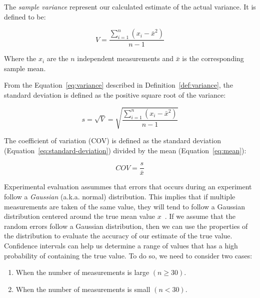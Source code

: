 \begin{definition}
 The \emph{sample variance}
represent our calculated estimate of the actual variance. It is defined to be:

\begin{equation}\label{eq:variance}
V = \frac{\sum_{i = 1}^n(x_i - \bar{x}^2)}{n - 1}
\end{equation}

\noindent Where the \(x_i\) are the \(n\) independent measurements and \(\bar{x}\) is
the corresponding sample mean.
\end{definition}

\begin{definition}
 From the Equation~\ref{eq:variance} described in Definition~\ref{def:variance}, the standard
deviation is defined as the positive square root of the variance:

\begin{equation}\label{eq:standard-deviation}
s = \sqrt{V} = \sqrt{\frac{\sum_{i = 1}^n(x_i - \bar{x}^2)}{n - 1}}
\end{equation}

\end{definition}

\begin{definition}
  The coefficient of variation (COV) is defined as the standard deviation (Equation~\ref{eq:standard-deviation}) divided by the mean (Equation~\ref{eq:mean}):

\begin{equation}\label{eq:cov}
  COV = \frac{s}{\bar{x}}
\end{equation}
\end{definition}


Experimental evaluation assummes that errors that occurs during an experiment follow a \textit{Gaussian} (a.k.a. normal) distribution. This implies that if multiple measurements are taken of the same value, they will tend to follow a Gaussian distribution centered around the true mean value  \(x\)~\cite{lilja2005measuring}. If we assume that the random errors follow a Gaussian distribution, then we can use the properties of the distribution to evaluate the accuracy of our estimate of the true value. Confidence intervals can help us determine a range of values that has a high probability of containing the true value. To do so, we need to consider two cases:

\begin{enumerate}
\item When the number of measurements is large \((n \ge 30)\).
\item When the number of measurements is small \((n < 30)\).
\end{enumerate}

